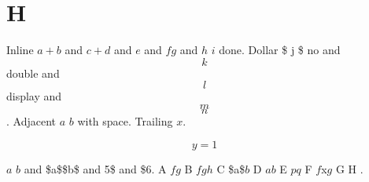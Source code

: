 \documentclass[11pt]{article}
\author{root}
\date{\today}
\title{}
\begin{document}
\tableofcontents

\section{H}
\label{sec:orgb903c32}
Inline \(a+b\) and \(c+d\) and \(e\) and \(f g\) and \(h\) \(i\) done.
Dollar \$ j \$ no and $$ k $$ double and \[ l \] display and \[ m \]\[ n \].
Adjacent \(a\) \(b\) with space. Trailing \(x\).

\begin{equation}
 y = 1
\end{equation}

\(a\) \(b\) and \$a\$\$b\$ and 5\$ and \$6.
A \(f   g\) B \(f g h\) C \$a\$\(b\) D \(a b\) E \(p
q\) F \(f\)x\(g\) G H .
\end{document}
